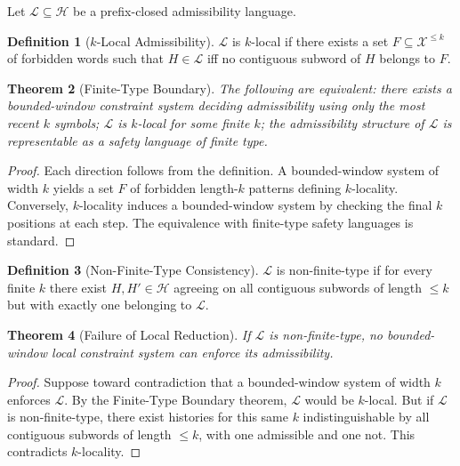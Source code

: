 \documentclass[12pt, a4paper]{article}
\theoremstyle{plain}
\newtheorem{theorem}{Theorem}[section]
\theoremstyle{definition}
\newtheorem{definition}[theorem]{Definition}
\theoremstyle{remark}
\begin{document}
Let $\mathcal{L} \subseteq \mathcal{H}$ be a prefix-closed admissibility language.

\begin{definition}[$k$-Local Admissibility]
$\mathcal{L}$ is $k$-local if there exists a set $F \subseteq \mathcal{X}^{\le k}$ of forbidden words such that $H \in \mathcal{L}$ iff no contiguous subword of $H$ belongs to $F$.
\end{definition}

\begin{theorem}[Finite-Type Boundary]
The following are equivalent: there exists a bounded-window constraint system deciding admissibility using only the most recent $k$ symbols; $\mathcal{L}$ is $k$-local for some finite $k$; the admissibility structure of $\mathcal{L}$ is representable as a safety language of finite type.
\end{theorem}

\begin{proof}
Each direction follows from the definition. A bounded-window system of width $k$ yields a set $F$ of forbidden length-$k$ patterns defining $k$-locality. Conversely, $k$-locality induces a bounded-window system by checking the final $k$ positions at each step. The equivalence with finite-type safety languages is standard.
\end{proof}

\begin{definition}[Non-Finite-Type Consistency]
$\mathcal{L}$ is non-finite-type if for every finite $k$ there exist $H, H' \in \mathcal{H}$ agreeing on all contiguous subwords of length $\le k$ but with exactly one belonging to $\mathcal{L}$.
\end{definition}

\begin{theorem}[Failure of Local Reduction]
If $\mathcal{L}$ is non-finite-type, no bounded-window local constraint system can enforce its admissibility.
\end{theorem}

\begin{proof}
Suppose toward contradiction that a bounded-window system of width $k$ enforces $\mathcal{L}$. By the Finite-Type Boundary theorem, $\mathcal{L}$ would be $k$-local. But if $\mathcal{L}$ is non-finite-type, there exist histories for this same $k$ indistinguishable by all contiguous subwords of length $\le k$, with one admissible and one not. This contradicts $k$-locality.
\end{proof}
\end{document}
